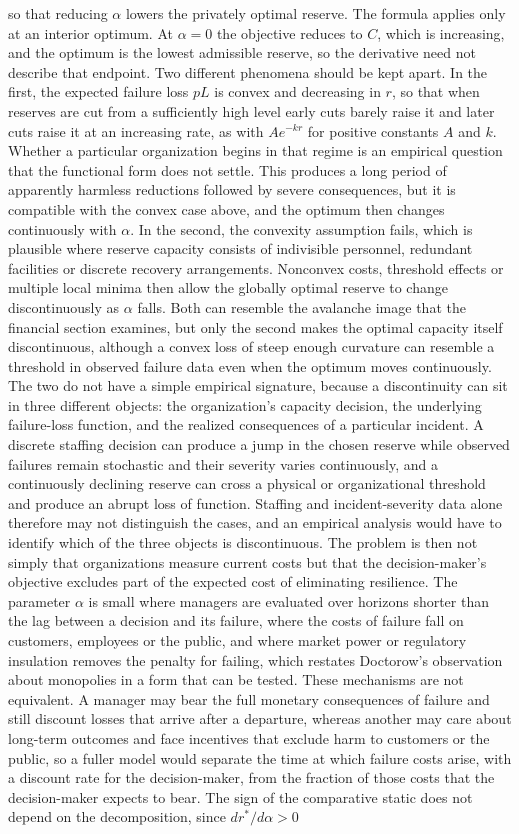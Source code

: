 \documentclass[12pt]{article}
\begin{document}
so that reducing $\alpha$ lowers the privately optimal reserve. The formula applies only at an interior optimum. At $\alpha = 0$ the objective reduces to $C$, which is increasing, and the optimum is the lowest admissible reserve, so the derivative need not describe that endpoint. Two different phenomena should be kept apart. In the first, the expected failure loss $pL$ is convex and decreasing in $r$, so that when reserves are cut from a sufficiently high level early cuts barely raise it and later cuts raise it at an increasing rate, as with $Ae^{-kr}$ for positive constants $A$ and $k$. Whether a particular organization begins in that regime is an empirical question that the functional form does not settle. This produces a long period of apparently harmless reductions followed by severe consequences, but it is compatible with the convex case above, and the optimum then changes continuously with $\alpha$. In the second, the convexity assumption fails, which is plausible where reserve capacity consists of indivisible personnel, redundant facilities or discrete recovery arrangements. Nonconvex costs, threshold effects or multiple local minima then allow the globally optimal reserve to change discontinuously as $\alpha$ falls. Both can resemble the avalanche image that the financial section examines, but only the second makes the optimal capacity itself discontinuous, although a convex loss of steep enough curvature can resemble a threshold in observed failure data even when the optimum moves continuously. The two do not have a simple empirical signature, because a discontinuity can sit in three different objects: the organization's capacity decision, the underlying failure-loss function, and the realized consequences of a particular incident. A discrete staffing decision can produce a jump in the chosen reserve while observed failures remain stochastic and their severity varies continuously, and a continuously declining reserve can cross a physical or organizational threshold and produce an abrupt loss of function. Staffing and incident-severity data alone therefore may not distinguish the cases, and an empirical analysis would have to identify which of the three objects is discontinuous. The problem is then not simply that organizations measure current costs but that the decision-maker's objective excludes part of the expected cost of eliminating resilience. The parameter $\alpha$ is small where managers are evaluated over horizons shorter than the lag between a decision and its failure, where the costs of failure fall on customers, employees or the public, and where market power or regulatory insulation removes the penalty for failing, which restates Doctorow's observation about monopolies in a form that can be tested. These mechanisms are not equivalent. A manager may bear the full monetary consequences of failure and still discount losses that arrive after a departure, whereas another may care about long-term outcomes and face incentives that exclude harm to customers or the public, so a fuller model would separate the time at which failure costs arise, with a discount rate for the decision-maker, from the fraction of those costs that the decision-maker expects to bear. The sign of the comparative static does not depend on the decomposition, since $dr^{*}/d\alpha > 0$ 
\end{document}
